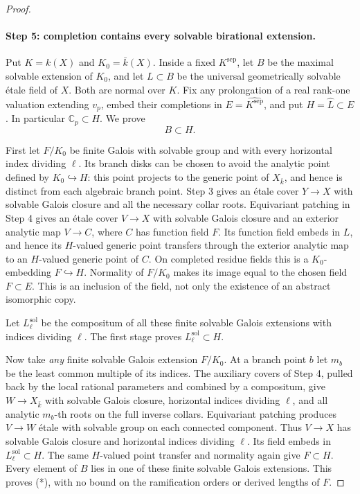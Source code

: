 \begin{proof}
\paragraph{Step 5: completion contains every solvable birational extension.}

Put $K=k(X)$ and $K_0=\bar k(X)$.  Inside a fixed $K^{\mathrm{sep}}$,
let $B$ be the maximal solvable extension of $K_0$, and let $L\subset B$
be the universal geometrically solvable \'etale field of $X$.
Both are normal over $K$.  Fix any prolongation of a real rank-one
valuation extending $v_p$, embed their completions in
$E=\widehat{K^{\mathrm{sep}}}$, and put $H=\widehat L\subset E$.
In particular $\mathbb C_p\subset H$.  We prove
\[
                              B\subset H.                 \tag{*}
\]

First let $F/K_0$ be finite Galois with solvable group and with every
horizontal index dividing $\ell$.  Its branch disks can be chosen
to avoid the analytic point defined by $K_0\hookrightarrow H$:
this point projects to the generic point of $X_{\bar k}$, and hence
is distinct from each algebraic branch point.  Step 3 gives an
\'etale cover $Y\to X$ with solvable Galois closure and all the
necessary collar roots.  Equivariant patching in Step 4 gives
an \'etale cover $V\to X$ with solvable Galois closure and an
exterior analytic map $V\to C$, where $C$ has function field $F$.
Its function field embeds in $L$, and hence its $H$-valued generic
point transfers through the exterior analytic map to an $H$-valued
generic point of $C$.  On completed residue fields this is a
$K_0$-embedding $F\hookrightarrow H$.  Normality of $F/K_0$ makes
its image equal to the chosen field $F\subset E$.  This is an
inclusion of the field, not only the existence of an abstract
isomorphic copy.

Let $L_\ell^{\mathrm{sol}}$ be the compositum of all these finite
solvable Galois extensions with indices dividing $\ell$.  The first
stage proves $L_\ell^{\mathrm{sol}}\subset H$.

Now take \emph{any} finite solvable Galois extension $F/K_0$.
At a branch point $b$ let $m_b$ be the least common multiple of its
indices.  The auxiliary covers of Step 4, pulled back by the
local rational parameters and combined by a compositum, give
$W\to X_{\bar k}$ with solvable Galois closure, horizontal indices
dividing $\ell$, and all analytic $m_b$-th roots on the full inverse
collars.  Equivariant patching produces $V\to W$ \'etale with
solvable group on each connected component.  Thus $V\to X$ has
solvable Galois closure and horizontal indices dividing $\ell$.
Its field embeds in $L_\ell^{\mathrm{sol}}\subset H$.  The same
$H$-valued point transfer and normality again give $F\subset H$.
Every element of $B$ lies in one of these finite solvable Galois
extensions.  This proves (*), with no bound on the ramification
orders or derived lengths of $F$.


\end{proof}
